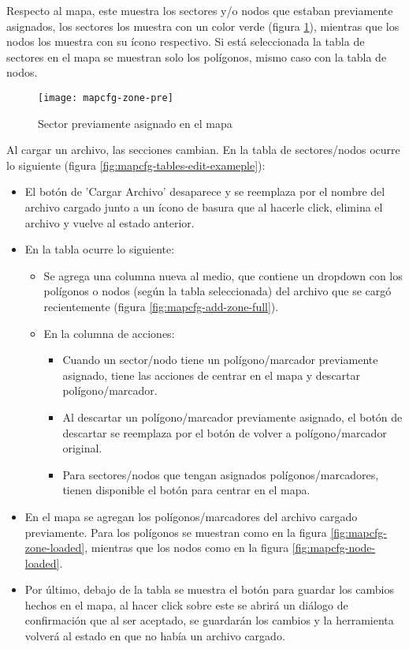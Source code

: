 Respecto al mapa, este muestra los sectores y/o nodos que estaban previamente asignados, los sectores los muestra con un color verde (figura \ref{fig:mapcfg-zone-pre}), mientras que los nodos los muestra con su ícono respectivo. Si está seleccionada la tabla de sectores en el mapa se muestran solo los polígonos, mismo caso con la tabla de nodos.
\begin{figure}[H]
	\centering
	\texttt{[image: mapcfg-zone-pre]}
	\caption{\label{fig:mapcfg-zone-pre} Sector previamente asignado en el mapa}
\end{figure}

Al cargar un archivo, las secciones cambian. En la tabla de sectores/nodos ocurre lo siguiente (figura \ref{fig:mapcfg-tables-edit-exameple}):

\begin{itemize}
    \item El botón de 'Cargar Archivo' desaparece y se reemplaza por el nombre del archivo cargado junto a un ícono de basura que al hacerle click, elimina el archivo y vuelve al estado anterior.
    \item En la tabla ocurre lo siguiente:
    \begin{itemize}
        \item Se agrega una columna nueva al medio, que contiene un dropdown con los polígonos o nodos (según la tabla seleccionada) del archivo que se cargó recientemente (figura \ref{fig:mapcfg-add-zone-full}).
        \item En la columna de acciones:
        \begin{itemize}        
            \item Cuando un sector/nodo tiene un polígono/marcador previamente asignado, tiene las acciones de centrar en el mapa y descartar polígono/marcador.
            \item Al descartar un polígono/marcador previamente asignado, el botón de descartar se reemplaza por el botón de volver a polígono/marcador original.
            \item Para sectores/nodos que tengan asignados polígonos/marcadores, tienen disponible el botón para centrar en el mapa.
        \end{itemize}
    \end{itemize}
    \item En el mapa se agregan los polígonos/marcadores del archivo cargado previamente. Para los polígonos se muestran como en la figura \ref{fig:mapcfg-zone-loaded}, mientras que los nodos como en la figura \ref{fig:mapcfg-node-loaded}.
    \item Por último, debajo de la tabla se muestra el botón para guardar los cambios hechos en el mapa, al hacer click sobre este se abrirá un diálogo de confirmación que al ser aceptado, se guardarán los cambios y la herramienta volverá al estado en que no había un archivo cargado.
\end{itemize}

